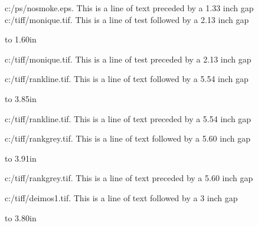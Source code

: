 \noindent c:/ps/nosmoke.eps. This is a line of text preceded by a 1.33 inch gap
\noindent c:/tiff/monique.tif. This is a line of test followed by a 2.13 inch gap

\vskip 2.13in

\centerline{\hbox to 1.60in{\hfill}}


\noindent c:/tiff/monique.tif. This is a line of test preceded by a 2.13 inch gap


\newpage

\noindent c:/tiff/rankline.tif. This is a line of text followed by a 5.54 inch gap

\vskip 5.54in

\centerline{\hbox to 3.85in{\hfill}}


\noindent c:/tiff/rankline.tif. This is a line of text preceded by a 5.54 inch gap


\newpage

\noindent c:/tiff/rankgrey.tif. This is a line of text followed by a 5.60 inch gap

\vskip 5.60in

\centerline{\hbox to 3.91in{\hfill}}


\noindent c:/tiff/rankgrey.tif. This is a line of text preceded by a 5.60 inch gap


\newpage

\noindent c:/tiff/deimos1.tif. This is a line of text followed by a 3 inch gap

\vskip 3in %

\centerline{\hbox to 3.80in{\hfill}}



